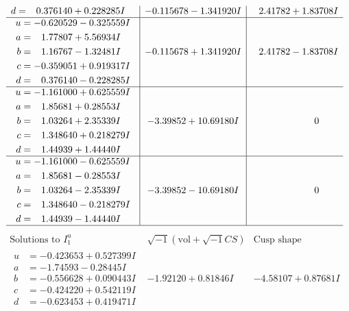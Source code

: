 \documentclass[1p]{elsarticle_modified}
\theoremstyle{definition}
\newcommand{\I}{\sqrt{-1}}
\begin{document}
$$\begin{array}{c|c|c}
\begin{aligned}
d &= \phantom{-}0.376140 + 0.228285 I\end{aligned}
 & -0.115678 - 1.341920 I & \phantom{-}2.41782 + 1.83708 I \\ \hline\begin{aligned}
u &= -0.620529 - 0.325559 I \\
a &= \phantom{-}1.77807 + 5.56934 I \\
b &= \phantom{-}1.16767 - 1.32481 I \\
c &= -0.359051 + 0.919317 I \\
d &= \phantom{-}0.376140 - 0.228285 I\end{aligned}
 & -0.115678 + 1.341920 I & \phantom{-}2.41782 - 1.83708 I \\ \hline\begin{aligned}
u &= -1.161000 + 0.625559 I \\
a &= \phantom{-}1.85681 + 0.28553 I \\
b &= \phantom{-}1.03264 + 2.35339 I \\
c &= \phantom{-}1.348640 + 0.218279 I \\
d &= \phantom{-}1.44939 + 1.44440 I\end{aligned}
 & -3.39852 + 10.69180 I & \phantom{-0.000000 } 0 \\ \hline\begin{aligned}
u &= -1.161000 - 0.625559 I \\
a &= \phantom{-}1.85681 - 0.28553 I \\
b &= \phantom{-}1.03264 - 2.35339 I \\
c &= \phantom{-}1.348640 - 0.218279 I \\
d &= \phantom{-}1.44939 - 1.44440 I\end{aligned}
 & -3.39852 - 10.69180 I & \phantom{-0.000000 } 0\\
 \hline 
 \end{array}$$\newpage$$\begin{array}{c|c|c}  
\text{Solutions to }I^u_{1}& \I (\text{vol} + \sqrt{-1}CS) & \text{Cusp shape}\\
 \hline 
\begin{aligned}
u &= -0.423653 + 0.527399 I \\
a &= -1.74593 - 0.28445 I \\
b &= -0.556628 + 0.090443 I \\
c &= -0.424220 + 0.542119 I \\
d &= -0.623453 + 0.419471 I\end{aligned}
 & -1.92120 + 0.81846 I & -4.58107 + 0.87681 I \\ \hline\begin{aligned}

\end{aligned}
\end{array}$$
\end{document}
